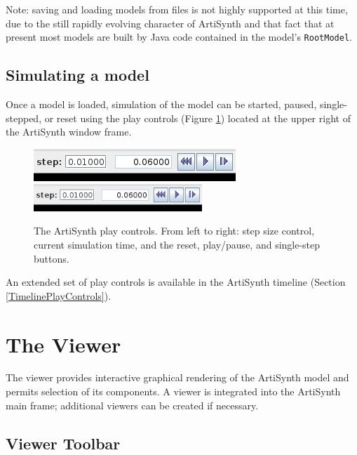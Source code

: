 \documentclass{article}
\begin{document}
\begin{sideblock}
Note: saving and loading models from files is not highly supported at
this time, due to the still rapidly evolving character of ArtiSynth
and that fact that at present most models are built by Java code
contained in the model's {\tt RootModel}.
\end{sideblock}

\subsection{Simulating a model}

Once a model is loaded, simulation of the model can be started,
paused, single-stepped, or reset using the play controls (Figure
\ref{PlayControlsFig}) located at the upper right of the ArtiSynth
window frame.

\begin{figure}
\begin{center}
\iflatexml
\includegraphics[]{images/playControls}
\else
\includegraphics[width=2.5in]{images/playControls}
\fi
\end{center}
\caption{The ArtiSynth play controls. From left to right: step size
control, current simulation time, and the reset, play/pause, and
single-step buttons.}%
\label{PlayControlsFig}
\end{figure}

An extended set of play controls is available in the ArtiSynth
timeline (Section \ref{TimelinePlayControls}).

\section{The Viewer}

The viewer provides interactive graphical rendering of the ArtiSynth
model and permits selection of its components. A viewer is integrated
into the ArtiSynth main frame; additional viewers can be created
if necessary.

\subsection{Viewer Toolbar}
\end{document}
